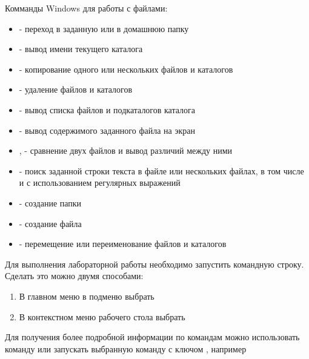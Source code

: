 \documentclass[a4paper,12pt]{article}
\begin{document}
  
    \begin{flushleft}
        Комманды Windows для работы с файлами:
        \begin{itemize}
            \item {} - переход в заданную или в домашнюю папку
            \item {} - вывод имени текущего каталога
            \item {} - копирование одного или нескольких файлов и каталогов
            \item {} - удаление файлов и каталогов
            \item {} - вывод списка файлов и подкаталогов каталога
            \item {} - вывод содержимого заданного файла на экран
            \item {},  - сравнение двух файлов и вывод различий между ними
            \item {} - поиск заданной строки текста в файле или нескольких файлах, в том числе и с использованием регулярных выражений
            \item {} - создание папки
            \item {} - создание файла
            \item {} - перемещение или переименование файлов и каталогов
        \end{itemize}
    \end{flushleft}
  
    \begin{flushleft}
        Для выполнения лабораторной работы необходимо запустить командную строку. Сделать это можно двумя способами:
        \begin{enumerate}
            \item В главном меню в подменю  выбрать 
            \item В контекстном меню рабочего стола выбрать 
        \end{enumerate}
    \end{flushleft}
  
    \begin{flushleft}
    Для получения более подробной информации по командам можно использовать команду  или запускать выбранную команду с ключом , например 
    \end{flushleft}
  
\end{document}
